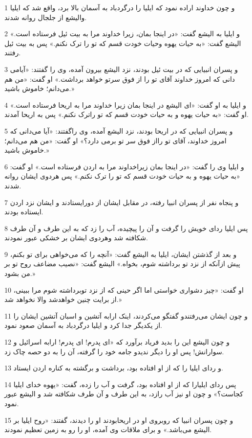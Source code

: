 \par 1 و چون خداوند اراده نمود که ایلیا را درگردباد به آسمان بالا برد، واقع شد که ایلیا والیشع از جلجال روانه شدند.
\par 2 و ایلیا به الیشع گفت: «در اینجا بمان، زیرا خداوند مرا به بیت ئیل فرستاده است.» الیشع گفت: «به حیات یهوه وحیات خودت قسم که تو را ترک نکنم.» پس به بیت ئیل رفتند.
\par 3 و پسران انبیایی که در بیت ئیل بودند، نزد الیشع بیرون آمده، وی را گفتند: «آیامی دانی که امروز خداوند آقای تو را از فوق سرتو خواهد برداشت.» او گفت: «من هم می‌دانم؛ خاموش باشید.»
\par 4 و ایلیا به او گفت: «ای الیشع در اینجا بمان زیرا خداوند مرا به اریحا فرستاده است.» او گفت: «به حیات یهوه و به حیات خودت قسم که تو راترک نکنم.» پس به اریحا آمدند.
\par 5 و پسران انبیایی که در اریحا بودند، نزد الیشع آمده، وی راگفتند: «آیا می‌دانی که امروز خداوند، آقای تو رااز فوق سر تو برمی دارد؟» او گفت: «من هم می‌دانم؛ خاموش باشید.»
\par 6 و ایلیا وی را گفت: «در اینجا بمان زیراخداوند مرا به اردن فرستاده است.» او گفت: «به حیات یهوه و به حیات خودت قسم که تو را ترک نکنم.» پس هردوی ایشان روانه شدند.
\par 7 و پنجاه نفر از پسران انبیا رفته، در مقابل ایشان از دورایستادند و ایشان نزد اردن ایستاده بودند.
\par 8 پس ایلیا ردای خویش را گرفت و آن را پیچیده، آب را زد که به این طرف و آن طرف شکافته شد وهردوی ایشان بر خشکی عبور نمودند.
\par 9 و بعد از گذشتن ایشان، ایلیا به الیشع گفت: «آنچه را که می‌خواهی برای تو بکنم، پیش ازآنکه از نزد تو برداشته شوم، بخواه.» الیشع گفت: «نصیب مضاعف روح تو بر من بشود.»
\par 10 او گفت: «چیز دشواری خواستی اما اگر حینی که از نزد توبرداشته شوم مرا ببینی، از برایت چنین خواهدشد والا نخواهد شد.»
\par 11 و چون ایشان می‌رفتندو گفتگو می‌کردند، اینک ارابه آتشین و اسبان آتشین ایشان را از یکدیگر جدا کرد و ایلیا درگردباد به آسمان صعود نمود.
\par 12 و چون الیشع این را بدید فریاد برآورد که «ای پدرم! ای پدرم! ارابه اسرائیل و سوارانش! پس او را دیگر ندیدو جامه خود را گرفته، آن را به دو حصه چاک زد.
\par 13 و ردای ایلیا را که از او افتاده بود، برداشت و برگشته به کناره اردن ایستاد.
\par 14 پس ردای ایلیارا که از او افتاده بود، گرفت و آب را زده، گفت: «یهوه خدای ایلیا کجاست؟» و چون او نیز آب رازد، به این طرف و آن طرف شکافته شد و الیشع عبور نمود.
\par 15 و چون پسران انبیا که روبروی او در اریحابودند او را دیدند، گفتند: «روح ایلیا بر الیشع می‌باشد.» و برای ملاقات وی آمده، او را رو به زمین تعظیم نمودند.
